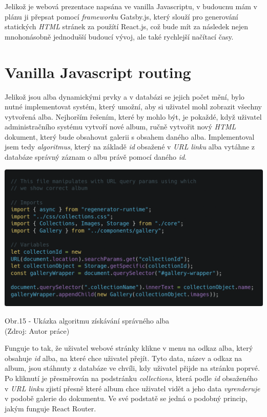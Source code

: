 \documentclass[12pt,a4paper]{report}
\begin{document}
  Jelikož je webová prezentace napsána ve vanilla Javascriptu, v budoucnu mám v plánu ji přepsat
  pomocí \emph{frameworku} Gatsby.js, který slouží pro generování statických \emph{HTML} stránek za použítí
  React.js, což bude mít za následek nejen mnohonásobně jednodušší budoucí vývoj, ale také
  rychlejší načítací časy.

  \section{Vanilla Javascript routing}
  Jelikož jsou alba dynamickými prvky a v databázi se jejich počet mění, bylo nutné implementovat systém, který
  umožní, aby si uživatel mohl zobrazit všechny vytvořená alba. Nejhorším řešením, které by mohlo být,
  je pokaždé, když uživatel administračního systému vytvoří nové album, ručně vytvořit nový \emph{HTML} dokument, který bude 
  obsahovat galerii s obsahem daného alba. Implementoval jsem tedy \emph{algoritmus}, který na základě \emph{id} obsažené v \emph{URL linku} alba vytáhne z
  databáze správný záznam o albu právě pomocí daného \emph{id}.
  \vfill

  \vspace*{0.5cm}
  \noindent\includegraphics[width=\linewidth]{vanillaJsRoutingCodeblock.png}
  \begin{center}
    Obr.15 -   Ukázka algoritmu získávání správného alba \\
    (Zdroj: Autor práce)
  \end{center}
  \vspace*{0.5cm}

  Funguje to tak, že uživatel webové stránky klikne v menu na odkaz alba, který obsahuje \emph{id} alba, na které chce uživatel přejít.
  Tyto data, název a odkaz na album, jsou stáhnuty z databáze ve chvíli, kdy uživatel přijde na stránku poprvé.
  Po kliknutí je přesměrován na podstránku \emph{collections}, která podle \emph{id} obsaženého v \emph{URL linku}
  zjistí přesně které album chce uživatel vidět a jeho data \emph{vyrenderuje} v podobě galerie do dokumentu.
  Ve své podstatě se jedná o podobný princip, jakým funguje React Router.
\end{document}
